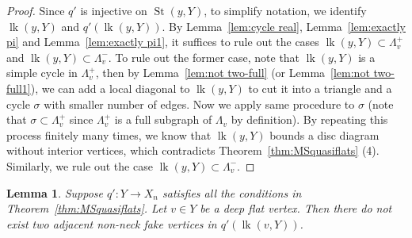 \documentclass[11pt]{amsart}
\newcommand{\lk}{\operatorname{lk}}
\newcommand{\St}{\operatorname{St}}
\newtheorem{lemma}[theorem]{Lemma}
\theoremstyle{definition}
\begin{document}
\begin{proof}
Since $q'$ is injective on $\St(y,Y)$, to simplify notation, we identify $\lk(y,Y)$ and $q'(\lk(y,Y))$. By Lemma~\ref{lem:cycle real}, Lemma~\ref{lem:exactly pi} and Lemma~\ref{lem:exactly pi1}, it suffices to rule out the cases $\lk(y,Y)\subset\Lambda^+_v$ and $\lk(y,Y)\subset\Lambda^-_v$. To rule out the former case, note that $\lk(y,Y)$ is a simple cycle in $\Lambda^+_v$, then by Lemma~\ref{lem:not two-full} (or Lemma~\ref{lem:not two-full1}), we can add a local diagonal to $\lk(y,Y)$ to cut it into a triangle and a cycle $\sigma$ with smaller number of edges. Now we apply same procedure to $\sigma$ (note that $\sigma\subset \Lambda^+_v$ since $\Lambda^+_v$ is a full subgraph of $\Lambda_v$ by definition). By repeating this process finitely many times, we know that $\lk(y,Y)$ bounds a disc diagram without interior vertices, which contradicts Theorem~\ref{thm:MSquasiflats} (4). Similarly, we rule out the case $\lk(y,Y)\subset\Lambda^-_v$.
\end{proof}

\begin{lemma}
	\label{lem:local}
Suppose $q'\colon   Y\to X_n$ satisfies all the conditions in Theorem~\ref{thm:MSquasiflats}. Let $v\in Y$ be a deep flat vertex. Then there do not exist two adjacent non-neck fake vertices in $q'(\lk(v,Y))$.
\end{lemma}
\end{document}
